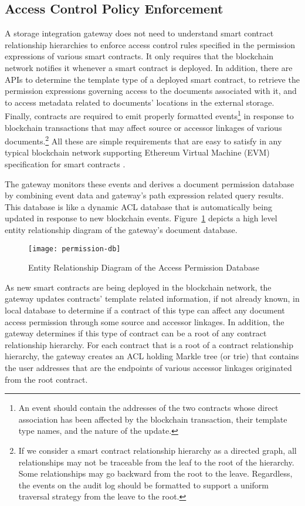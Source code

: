 \subsection{Access Control Policy Enforcement}
A storage integration gateway does not need to understand smart contract relationship hierarchies to enforce access control rules specified in the permission expressions of various smart contracts. It only requires that the blockchain network notifies it whenever a smart contract is deployed. In addition, there are APIs to determine the template type of a deployed smart contract, to retrieve the permission expressions governing access to the documents associated with it, and to access metadata related to documents' locations in the external storage. Finally, contracts are required to emit properly formatted events\footnote{An event should contain the addresses of the two contracts whose direct association has been affected by the blockchain transaction, their template type names, and the nature of the update.} in response to blockchain transactions that may affect source or accessor linkages of various documents.\footnote{If we consider a smart contract relationship hierarchy as a directed graph, all relationships may not be traceable from the leaf to the root of the hierarchy. Some relationships may go backward from the root to the leave. Regardless, the events on the audit log should be formatted to support a uniform traversal strategy from the leave to the root.} All these are simple requirements that are easy to satisfy in any typical blockchain network supporting Ethereum Virtual Machine (EVM) specification for smart contracts \cite{Wood2014EthereumAS}.

The gateway monitors these events and derives a document permission database by combining event data and gateway's path expression related query results. This database is like a dynamic ACL database that is automatically being updated in response to new blockchain events. Figure~\ref{fig:perm-ERD} depicts a high level entity relationship diagram of the gateway's document database.
\begin{figure}[h]
\centering
\texttt{[image: permission-db]}                    
\caption{Entity Relationship Diagram of the Access Permission Database}\label{fig:perm-ERD}
\end{figure}
       
As new smart contracts are being deployed in the blockchain network, the gateway updates contracts' template related information, if not already known, in local database to determine if a contract of this type can affect any document access permission through some source and accessor linkages. In addition, the gateway determines if this type of contract can be a root of any contract relationship hierarchy. For each contract that is a root of a contract relationship hierarchy, the gateway creates an ACL holding Markle tree (or trie) \cite{6233691} that contains the user addresses that are the endpoints of various accessor linkages originated from the root contract.

